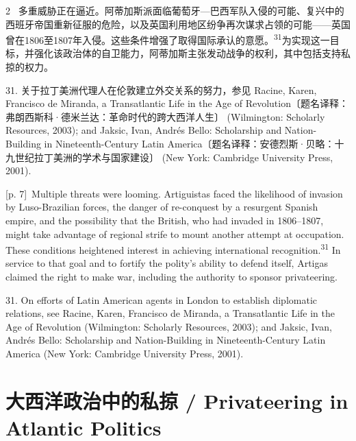 \documentclass[10pt,a4paper]{article}
\begin{document}
\begin{paracol}{2}
\switchcolumn*
{\scriptsize\color{gray} [p. 7]}\ 多重威胁正在逼近。阿蒂加斯派面临葡萄牙—巴西军队入侵的可能、复兴中的西班牙帝国重新征服的危险，以及英国利用地区纷争再次谋求占领的可能——英国曾在1806至1807年入侵。这些条件增强了取得国际承认的意\mbox{愿。\textsuperscript{31}}为实现这一目标，并强化该政治体的自卫能力，阿蒂加斯主张发动战争的权利，其中包括支持私掠的权力。\par{\small 31. 关于拉丁美洲代理人在伦敦建立外交关系的努力，参见 Racine, Karen, Francisco de Miranda, a Transatlantic Life in the Age of Revolution〔题名译释：弗朗西斯科·德米兰达：革命时代的跨大西洋人生〕 (Wilmington: Scholarly Resources, 2003); and Jaksic, Ivan, Andrés Bello: Scholarship and Nation-Building in Nineteenth-Century Latin America〔题名译释：安德烈斯·贝略：十九世纪拉丁美洲的学术与国家建设〕 (New York: Cambridge University Press, 2001).\par}
\switchcolumn
{\scriptsize\color{gray} [p. 7]}\ Multiple threats were looming. Artiguistas faced the likelihood of invasion by Luso-Brazilian forces, the danger of re-conquest by a resurgent Spanish empire, and the possibility that the British, who had invaded in 1806–1807, might take advantage of regional strife to mount another attempt at occupation. These conditions heightened interest in achieving international recognition.\nobreak\textsuperscript{31} In service to that goal and to fortify the polity’s ability to defend itself, Artigas claimed the right to make war, including the authority to sponsor privateering.\par{\small 31. On efforts of Latin American agents in London to establish diplomatic relations, see Racine, Karen, Francisco de Miranda, a Transatlantic Life in the Age of Revolution (Wilmington: Scholarly Resources, 2003); and Jaksic, Ivan, Andrés Bello: Scholarship and Nation-Building in Nineteenth-Century Latin America (New York: Cambridge University Press, 2001).\par}
\switchcolumn*
\end{paracol}
\section*{大西洋政治中的私掠 / Privateering in Atlantic Politics}
\end{document}
